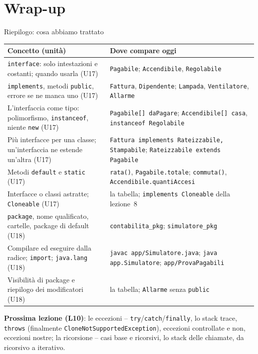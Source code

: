 \documentclass[10pt,aspectratio=169]{beamer}
\begin{document}
\section{Wrap-up}

\begin{frame}{Riepilogo: cosa abbiamo trattato}
\footnotesize
\begin{center}
\renewcommand{\arraystretch}{1.1}
\scriptsize
\begin{tabular}{|>{\raggedright\arraybackslash}p{6.2cm}|>{\raggedright\arraybackslash}p{7.6cm}|}
\hline
\textbf{Concetto (unità)} & \textbf{Dove compare oggi} \\
\hline
\texttt{interface}: solo intestazioni e costanti; quando usarla (U17) & \texttt{Pagabile}; \texttt{Accendibile}, \texttt{Regolabile} \\
\hline
\texttt{implements}, metodi \texttt{public}, errore se ne manca uno (U17) & \texttt{Fattura}, \texttt{Dipendente}; \texttt{Lampada}, \texttt{Ventilatore}, \texttt{Allarme} \\
\hline
L'interfaccia come tipo: polimorfismo, \texttt{instanceof}, niente \texttt{new} (U17) & \texttt{Pagabile[] daPagare}; \texttt{Accendibile[] casa}, \texttt{instanceof Regolabile} \\
\hline
Più interfacce per una classe; un'interfaccia ne estende un'altra (U17) & \texttt{Fattura implements Rateizzabile, Stampabile}; \texttt{Rateizzabile extends Pagabile} \\
\hline
Metodi \texttt{default} e \texttt{static} (U17) & \texttt{rata()}, \texttt{Pagabile.totale}; \texttt{commuta()}, \texttt{Accendibile.quantiAccesi} \\
\hline
Interfacce o classi astratte; \texttt{Cloneable} (U17) & la tabella; \texttt{implements Cloneable} della lezione~8 \\
\hline
\texttt{package}, nome qualificato, cartelle, package di default (U18) & \texttt{contabilita\_pkg}; \texttt{simulatore\_pkg} \\
\hline
Compilare ed eseguire dalla radice; \texttt{import}; \texttt{java.lang} (U18) & \texttt{javac app/Simulatore.java}; \texttt{java app.Simulatore}; \texttt{app/ProvaPagabili} \\
\hline
Visibilità di package e riepilogo dei modificatori (U18) & la tabella; \texttt{Allarme} senza \texttt{public} \\
\hline
\end{tabular}
\end{center}

\vspace{0.1cm}
\textbf{Prossima lezione (L10)}: le eccezioni -- \texttt{try}/\texttt{catch}/\texttt{finally}, lo stack trace, \texttt{throws} (finalmente \texttt{CloneNotSupportedException}), eccezioni controllate e non, eccezioni nostre; la ricorsione -- casi base e ricorsivi, lo stack delle chiamate, da ricorsivo a iterativo.
\end{frame}
\end{document}
